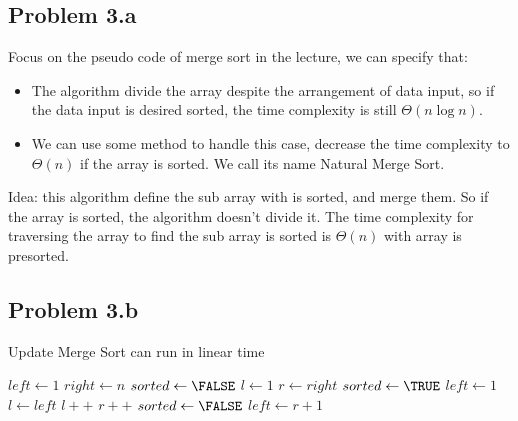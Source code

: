 \documentclass[a4paper]{article}
\begin{document}
\subsection{Problem 3.a}
Focus on the pseudo code of merge sort in the lecture, we can specify that: 
\begin{itemize}
    \item The algorithm divide the array despite the arrangement of data input, so if the data input is desired sorted, the time complexity is still $\Theta(n\log n)$.
    \item We can use some method to handle this case, decrease the time complexity to $\Theta(n)$ if the array is sorted. We call its name Natural Merge Sort.
\end{itemize}
Idea: this algorithm define the sub array with is sorted, and merge them. So if the array is sorted, the algorithm doesn't divide it. The time complexity for traversing the array to find the sub array is sorted is $\Theta(n)$ with array is presorted.
\subsection{Problem 3.b}
\begin{algorithm}
\renewcommand{\thealgorithm}{}
\caption{Update Merge Sort can run in linear time}
\begin{algorithmic}
    \State $left \gets 1$
    \State $right \gets n$
    \State $sorted \gets \FALSE $ 
    \State $l \gets 1$
    \State $r \gets right$
    \Do 
        \State $sorted \gets \TRUE$
        \State $left \gets 1$
            \State $l \gets left$
                \State $l++$
            \EndWhile
                \State $r++$
            \EndWhile
                \State {}
                \State $sorted \gets \FALSE$
            \EndIf
            \State $left \gets r+1$
        \EndWhile
\EndProcedure
\end{algorithmic}
\end{algorithm}
\newpage
\end{document}
